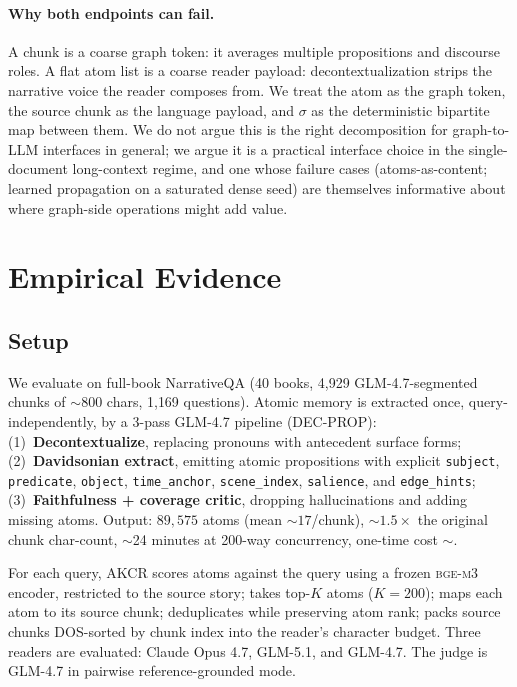 \documentclass{article}
\theoremstyle{plain}
\theoremstyle{definition}
\theoremstyle{remark}
\begin{document}
\paragraph{Why both endpoints can fail.} A chunk is a coarse graph token: it
averages multiple propositions and discourse roles. A flat atom list is a
coarse reader payload: decontextualization \citep{choi2021decontext} strips
the narrative voice the reader composes from. We treat the atom as the
graph token, the source chunk as the language payload, and $\sigma$ as the
deterministic bipartite map between them. We do not argue this is the right
decomposition for graph-to-LLM interfaces in general; we argue it is a
practical interface choice in the single-document long-context regime, and
one whose failure cases (atoms-as-content; learned propagation on a
saturated dense seed) are themselves informative about where graph-side
operations might add value.

\section{Empirical Evidence}
\label{sec:empirical}

\subsection{Setup}
We evaluate on full-book NarrativeQA (40 books, 4{,}929 GLM-4.7-segmented chunks
of $\sim$800 chars, 1{,}169 questions). Atomic memory is extracted once, query-
independently, by a 3-pass GLM-4.7 pipeline (DEC-PROP):
(1)~\textbf{Decontextualize}, replacing pronouns with antecedent surface forms;
(2)~\textbf{Davidsonian extract}, emitting atomic propositions with explicit
\texttt{subject}, \texttt{predicate}, \texttt{object}, \texttt{time\_anchor},
\texttt{scene\_index}, \texttt{salience}, and \texttt{edge\_hints};
(3)~\textbf{Faithfulness + coverage critic}, dropping hallucinations and adding
missing atoms. Output: $89{,}575$ atoms (mean $\sim$$17$/chunk),
$\sim$$1.5\times$ the original chunk char-count, $\sim$24 minutes at 200-way
concurrency, one-time cost $\sim$.

For each query, AKCR scores atoms against the query using a frozen
\textsc{bge-m3} encoder, restricted to the source story; takes top-$K$ atoms
($K=200$); maps each atom to its source chunk; deduplicates while preserving
atom rank; packs source chunks DOS-sorted by chunk index into the reader's
character budget. Three readers are evaluated: Claude Opus 4.7, GLM-5.1, and
GLM-4.7. The judge is GLM-4.7 in pairwise reference-grounded mode.
\end{document}
